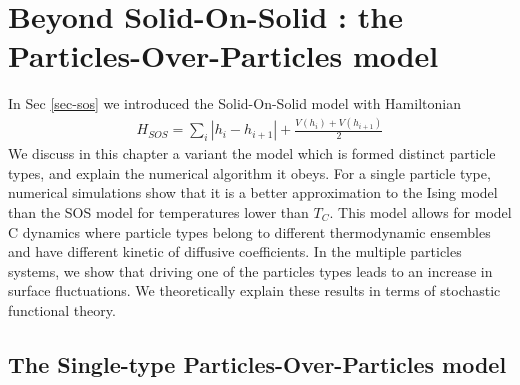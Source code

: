 \chapter{Beyond Solid-On-Solid : the Particles-Over-Particles model}
\label{chap-pop}

In Sec \ref{sec-sos} we introduced the Solid-On-Solid model with Hamiltonian
\begin{align}
H_{SOS} = \sum_i |h_i-h_{i+1}| + \frac{V(h_i)+V(h_{i+1})}{2}
\end{align}
We discuss in this chapter a variant the model which is formed distinct particle types, and explain the numerical algorithm it obeys. For a single particle type, numerical simulations show that it is a better approximation to the Ising model than the SOS model for temperatures lower than $T_C$. This model allows for model C dynamics where particle types belong to different thermodynamic ensembles and have different kinetic of diffusive coefficients.
In the multiple particles systems, we show that driving one of the particles types leads to an increase in surface fluctuations. We theoretically explain these results in terms of stochastic functional theory.

\section{The Single-type Particles-Over-Particles model}

